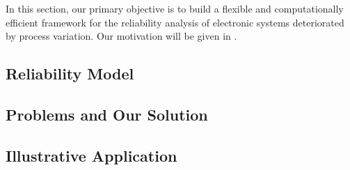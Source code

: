 In this section, our primary objective is to build a flexible and computationally efficient framework for the reliability analysis of electronic systems deteriorated by process variation.
Our motivation will be given in .

\subsection{Reliability Model} 


\subsection{Problems and Our Solution} 


\subsection{Illustrative Application}

